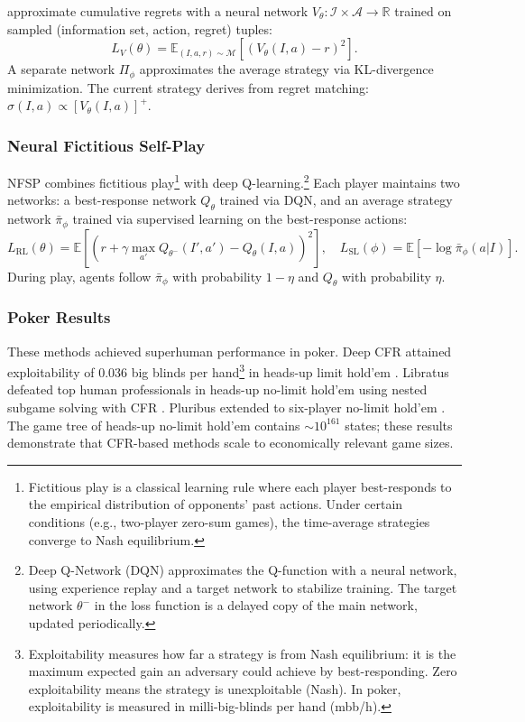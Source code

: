 \citet{Brown2019} approximate cumulative regrets with a neural network $V_\theta: \mathcal{I} \times \mathcal{A} \to \mathbb{R}$ trained on sampled (information set, action, regret) tuples:
\begin{equation}
L_V(\theta) = \mathbb{E}_{(I, a, r) \sim \mathcal{M}} \left[ (V_\theta(I, a) - r)^2 \right].
\end{equation}
A separate network $\Pi_\phi$ approximates the average strategy via KL-divergence minimization. The current strategy derives from regret matching: $\sigma(I, a) \propto [V_\theta(I, a)]^+$.

\subsubsection{Neural Fictitious Self-Play}

NFSP \citep{heinrich2016deep} combines fictitious play\footnote{Fictitious play \citep{Brown1951} is a classical learning rule where each player best-responds to the empirical distribution of opponents' past actions. Under certain conditions (e.g., two-player zero-sum games), the time-average strategies converge to Nash equilibrium.} \citep{Brown1951} with deep Q-learning.\footnote{Deep Q-Network (DQN) \citep{mnih2015} approximates the Q-function with a neural network, using experience replay and a target network to stabilize training. The target network $\theta^-$ in the loss function is a delayed copy of the main network, updated periodically.} Each player maintains two networks: a best-response network $Q_\theta$ trained via DQN, and an average strategy network $\bar{\pi}_\phi$ trained via supervised learning on the best-response actions:
\begin{equation}
L_{\text{RL}}(\theta) = \mathbb{E}\left[ \left( r + \gamma \max_{a'} Q_{\theta^-}(I', a') - Q_\theta(I, a) \right)^2 \right], \quad
L_{\text{SL}}(\phi) = \mathbb{E}\left[ -\log \bar{\pi}_\phi(a | I) \right].
\end{equation}
During play, agents follow $\bar{\pi}_\phi$ with probability $1-\eta$ and $Q_\theta$ with probability $\eta$.

\subsubsection{Poker Results}

These methods achieved superhuman performance in poker. Deep CFR attained exploitability of 0.036 big blinds per hand\footnote{Exploitability measures how far a strategy is from Nash equilibrium: it is the maximum expected gain an adversary could achieve by best-responding. Zero exploitability means the strategy is unexploitable (Nash). In poker, exploitability is measured in milli-big-blinds per hand (mbb/h).} in heads-up limit hold'em \citep{Brown2019}. Libratus defeated top human professionals in heads-up no-limit hold'em using nested subgame solving with CFR \citep{brown2017superhuman}. Pluribus extended to six-player no-limit hold'em \citep{brown2019superhuman}. The game tree of heads-up no-limit hold'em contains $\sim 10^{161}$ states; these results demonstrate that CFR-based methods scale to economically relevant game sizes.

